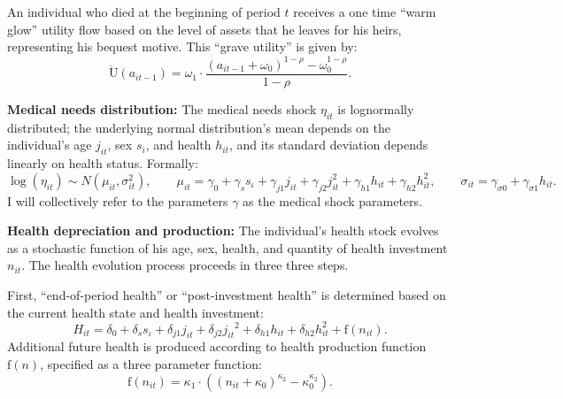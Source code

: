 \documentclass[12pt,pdftex,letterpaper]{article}
\newcommand{\Health}{h}
\newcommand{\PostHealth}{H}
\newcommand{\Utility}{\text{U}}
\newcommand{\Invst}{n}
\newcommand{\MedShkParam}{\gamma}
\newcommand{\Assets}{a}
\newcommand{\CRRAcon}{\rho}
\newcommand{\HealthParam}{\delta}
\newcommand{\Sex}{s}
\newcommand{\MedShk}{\eta}
\newcommand{\BequestParam}{\omega}
\newcommand{\HealthProdFunc}{\text{f}}
\newcommand{\HealthProdParam}{\kappa}
\begin{document}
An individual who died at the beginning of period $t$ receives a one time ``warm glow'' utility flow based on the level of assets that he leaves for his heirs, representing his bequest motive.  This ``grave utility'' is given by:
\begin{equation}\label{Bequest}
\grave{\Utility}(\Assets_{it-1}) = \BequestParam_1 \cdot \frac{(\Assets_{it-1} + \BequestParam_0)^{1 - \CRRAcon} - \BequestParam_0^{1 - \CRRAcon}}{1 - \CRRAcon}.
\end{equation}

\vspace{0.5cm}

\noindent \textbf{Medical needs distribution:} The medical needs shock $\MedShk_{it}$ is lognormally distributed; the underlying normal distribution's mean depends on the individual's age $j_{it}$, sex $\Sex_i$, and health $\Health_{it}$, and its standard deviation depends linearly on health status.  Formally:
\begin{equation}\label{MedShkDstn}
\log(\MedShk_{it}) \sim N(\mu_{it}, \sigma_{it}^2), \qquad \mu_{it} = \MedShkParam_0 + \MedShkParam_{\Sex} \Sex_{\iota} + \MedShkParam_{j1} j_{it} + \MedShkParam_{j2} j_{it}^2 + \MedShkParam_{\Health 1} \Health_{it} + \MedShkParam_{\Health 2} \Health_{it}^2, \qquad
\sigma_{it} = \MedShkParam_{\sigma 0} + \MedShkParam_{\sigma 1} \Health_{it}.
\end{equation}
I will collectively refer to the parameters $\MedShkParam$ as the medical shock parameters.

\vspace{0.5cm}

\noindent \textbf{Health depreciation and production:} The individual's health stock evolves as a stochastic function of his age, sex, health, and quantity of health investment $\Invst_{it}$.  The health evolution process proceeds in three three steps.

First, ``end-of-period health'' or ``post-investment health'' is determined based on the current health state and health investment:
\begin{equation}\label{PostHealth}
\PostHealth_{it} = \HealthParam_0 + \HealthParam_{\Sex} \Sex_\iota + \HealthParam_{j1} j_{it} + \HealthParam_{j2} {j_{it}}^2 + \HealthParam_{\Health 1} \Health_{it} + \HealthParam_{\Health 2} \Health_{it}^2 + \HealthProdFunc(\Invst_{it}).
\end{equation}
Additional future health is produced according to health production function $\HealthProdFunc(\Invst)$, specified as a three parameter function:
\begin{equation}\label{HealthProdFunc}
\HealthProdFunc(\Invst_{it}) = \HealthProdParam_1 \cdot \left( (\Invst_{it} + \HealthProdParam_0)^{\HealthProdParam_2} - \HealthProdParam_0^{\HealthProdParam_2} \right).
\end{equation}
\end{document}

